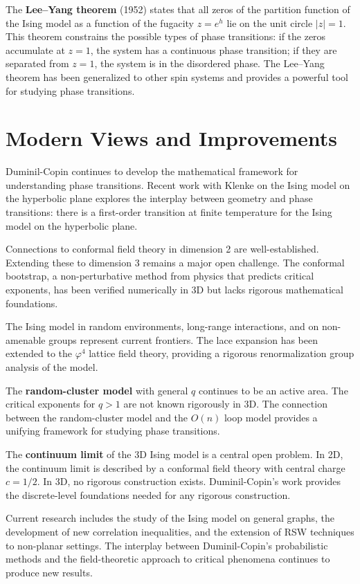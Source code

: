 The \textbf{Lee--Yang theorem} (1952) states that all zeros of the partition function of the Ising model as a function of the fugacity $z = e^{h}$ lie on the unit circle $|z|=1$. This theorem constrains the possible types of phase transitions: if the zeros accumulate at $z=1$, the system has a continuous phase transition; if they are separated from $z=1$, the system is in the disordered phase. The Lee--Yang theorem has been generalized to other spin systems and provides a powerful tool for studying phase transitions.

\section{Modern Views and Improvements}

Duminil-Copin continues to develop the mathematical framework for understanding phase transitions. Recent work with Klenke on the Ising model on the hyperbolic plane explores the interplay between geometry and phase transitions: there is a first-order transition at finite temperature for the Ising model on the hyperbolic plane.

Connections to conformal field theory in dimension 2 are well-established. Extending these to dimension 3 remains a major open challenge. The conformal bootstrap, a non-perturbative method from physics that predicts critical exponents, has been verified numerically in 3D but lacks rigorous mathematical foundations.

The Ising model in random environments, long-range interactions, and on non-amenable groups represent current frontiers. The lace expansion has been extended to the $\varphi^4$ lattice field theory, providing a rigorous renormalization group analysis of the model.

The \textbf{random-cluster model} with general $q$ continues to be an active area. The critical exponents for $q > 1$ are not known rigorously in 3D. The connection between the random-cluster model and the $O(n)$ loop model provides a unifying framework for studying phase transitions.

The \textbf{continuum limit} of the 3D Ising model is a central open problem. In 2D, the continuum limit is described by a conformal field theory with central charge $c = 1/2$. In 3D, no rigorous construction exists. Duminil-Copin's work \cite{duminilcopin2016} provides the discrete-level foundations needed for any rigorous construction.

Current research includes the study of the Ising model on general graphs, the development of new correlation inequalities, and the extension of RSW techniques to non-planar settings. The interplay between Duminil-Copin's probabilistic methods and the field-theoretic approach to critical phenomena continues to produce new results.

